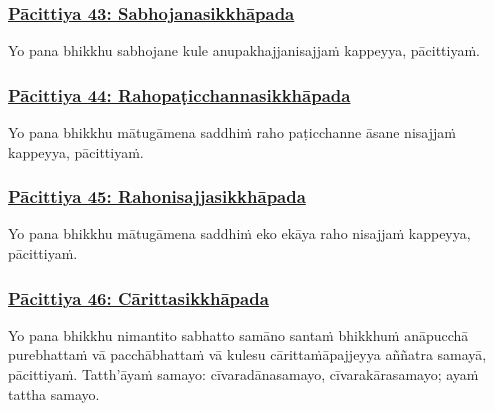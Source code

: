 \subsubsection*{\hyperref[exp43]{Pācittiya 43: Sabhojanasikkhāpada}}
\label{pac43}

Yo pana bhikkhu sabhojane kule anupakhajja\makeatletter\hyperlink{endnote314-appendix}\makeatother \thinspace nisajjaṁ kappeyya, pācittiyaṁ.



\subsubsection*{\hyperref[exp44]{Pācittiya 44: Rahopaṭicchannasikkhāpada}}
\label{pac44}

Yo pana bhikkhu mātugāmena saddhiṁ raho paṭicchanne āsane nisajjaṁ kappeyya, pācittiyaṁ.



\subsubsection*{\hyperref[exp45]{Pācittiya 45: Rahonisajjasikkhāpada}}
\label{pac45}

Yo pana bhikkhu mātugāmena saddhiṁ eko ekāya raho nisajjaṁ kappeyya, pācittiyaṁ.



\subsubsection*{\hyperref[exp46]{Pācittiya 46: Cārittasikkhāpada}}
\label{pac46}

Yo pana bhikkhu nimantito sabhatto samāno santaṁ bhikkhuṁ anāpucchā purebhattaṁ vā pacchābhattaṁ vā kulesu cārittaṁ\makeatletter\hyperlink{endnote315-appendix}\makeatother \thinspace āpajjeyya aññatra samayā, pācittiyaṁ. Tatth'āyaṁ samayo: cīvaradānasamayo, cīvarakārasamayo; ayaṁ tattha samayo.




